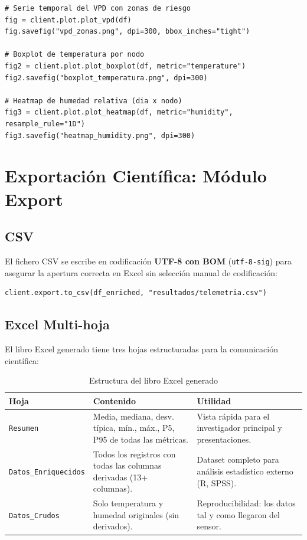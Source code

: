 \begin{lstlisting}[style=trama, caption={Generación de gráficos}]
# Serie temporal del VPD con zonas de riesgo
fig = client.plot.plot_vpd(df)
fig.savefig("vpd_zonas.png", dpi=300, bbox_inches="tight")

# Boxplot de temperatura por nodo
fig2 = client.plot.plot_boxplot(df, metric="temperature")
fig2.savefig("boxplot_temperatura.png", dpi=300)

# Heatmap de humedad relativa (dia x nodo)
fig3 = client.plot.plot_heatmap(df, metric="humidity", resample_rule="1D")
fig3.savefig("heatmap_humidity.png", dpi=300)
\end{lstlisting}

\section{Exportación Científica: Módulo Export}

\subsection{CSV}

El fichero CSV se escribe en codificación \textbf{UTF-8 con BOM} (\texttt{utf-8-sig})
para asegurar la apertura correcta en Excel sin selección manual de codificación:

\begin{lstlisting}[style=trama, caption={Exportación a CSV}]
client.export.to_csv(df_enriched, "resultados/telemetria.csv")
\end{lstlisting}

\subsection{Excel Multi-hoja}

El libro Excel generado tiene tres hojas estructuradas para la comunicación científica:

\begin{table}[H]
    \centering
    \caption{Estructura del libro Excel generado}
    \begin{tabularx}{\textwidth}{lXX}
        \toprule
        \textbf{Hoja}              & \textbf{Contenido} & \textbf{Utilidad} \\
        \midrule
        \texttt{Resumen}           & Media, mediana, desv. típica, mín., máx., P5, P95 de todas las métricas. & Vista rápida para el investigador principal y presentaciones. \\
        \texttt{Datos\_Enriquecidos} & Todos los registros con todas las columnas derivadas (13+ columnas). & Dataset completo para análisis estadístico externo (R, SPSS). \\
        \texttt{Datos\_Crudos}     & Solo temperatura y humedad originales (sin derivados). & Reproducibilidad: los datos tal y como llegaron del sensor. \\
        \bottomrule
    \end{tabularx}
\end{table}

